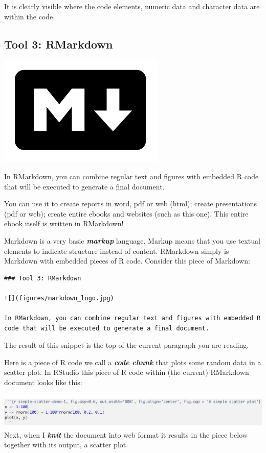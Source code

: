 \documentclass[]{book}
\begin{document}
It is clearly visible where the code elements, numeric data and character data are within the code.

\hypertarget{tool-3-rmarkdown}{%
\subsection{Tool 3: RMarkdown}\label{tool-3-rmarkdown}}

\includegraphics{figures/markdown_logo.jpg}

In RMarkdown, you can combine regular text and figures with embedded R code that will be executed to generate a final document.

You can use it to create reports in word, pdf or web (html); create presentations (pdf or web); create entire ebooks and websites (such as this one). This entire ebook itself is written in RMarkdown!

Markdown is a very basic \textbf{\emph{markup}} language. Markup means that you use textual elements to indicate structure instead of content. RMarkdown simply is Markdown with embedded pieces of R code. Consider this piece of Markdown:

\begin{verbatim}
### Tool 3: RMarkdown

![](figures/markdown_logo.jpg)

In RMarkdown, you can combine regular text and figures with embedded R code that will be executed to generate a final document.
\end{verbatim}

The result of this snippet is the top of the current paragraph you are reading.

Here is a piece of R code we call a \textbf{\emph{code chunk}} that plots some random data in a scatter plot. In RStudio this piece of R code within (the current) RMarkdown document looks like this:

\includegraphics{figures/code_chunk.png}
Next, when I \textbf{\emph{knit}} the document into web format it results in the piece below together with its output, a scatter plot.
\end{document}
